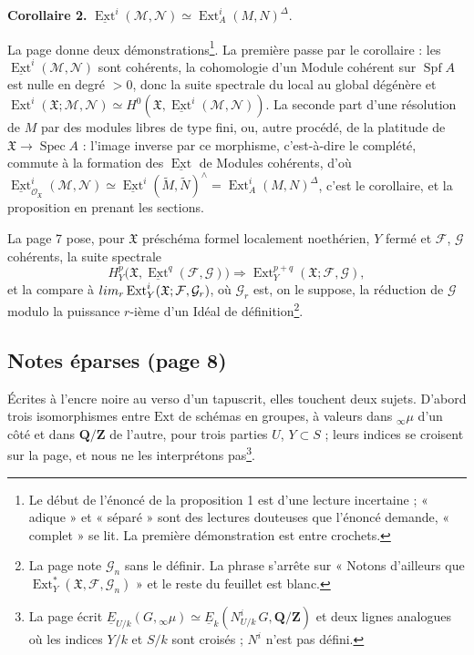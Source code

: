 \documentclass[11pt,a4paper]{article}
\begin{document}
\textbf{Corollaire 2.} $\underline{\operatorname{Ext}}^i(\mathcal{M},
\mathcal{N}) \simeq \operatorname{Ext}^i_A(M, N)^{\Delta}$.

La page donne deux démonstrations\footnote{Le début de l'énoncé de la
proposition 1 est d'une lecture incertaine ; « adique » et « séparé » sont des
lectures douteuses que l'énoncé demande, « complet » se lit. La première
démonstration est entre crochets.}. La première passe par le corollaire : les
$\underline{\operatorname{Ext}}^i(\mathcal{M}, \mathcal{N})$ sont cohérents, la
cohomologie d'un Module cohérent sur $\operatorname{Spf} A$ est nulle en degré
$> 0$, donc la suite spectrale du local au global dégénère et
$\operatorname{Ext}^i(\mathfrak{X}; \mathcal{M}, \mathcal{N}) \simeq
H^0(\mathfrak{X}, \underline{\operatorname{Ext}}^i(\mathcal{M}, \mathcal{N}))$.
La seconde part d'une résolution de $M$ par des modules libres de type fini,
ou, autre procédé, de la platitude de $\mathfrak{X} \to \operatorname{Spec} A$ :
l'image inverse par ce morphisme, c'est-à-dire le complété, commute à la
formation des $\underline{\operatorname{Ext}}$ de Modules cohérents, d'où
$\underline{\operatorname{Ext}}^i_{\mathcal{O}_{\mathfrak{X}}}(\mathcal{M},
\mathcal{N}) \simeq \underline{\operatorname{Ext}}^i(\widetilde{M},
\widetilde{N})^{\wedge} = \operatorname{Ext}^i_A(M, N)^{\Delta}$, c'est le
corollaire, et la proposition en prenant les sections.

La page 7 pose, pour $\mathfrak{X}$ préschéma formel localement noethérien,
$Y$ fermé et $\mathcal{F}$, $\mathcal{G}$ cohérents, la suite spectrale
\[
  H^p_Y\bigl(\mathfrak{X}, \underline{\operatorname{Ext}}^q(\mathcal{F},
  \mathcal{G})\bigr) \Rightarrow \operatorname{Ext}^{p+q}_Y(\mathfrak{X};
  \mathcal{F}, \mathcal{G}),
\]
et la compare à $\varprojlim_r \operatorname{Ext}^i_Y(\mathfrak{X};
\mathcal{F}, \mathcal{G}_r)$, où $\mathcal{G}_r$ est, on le suppose, la
réduction de $\mathcal{G}$ modulo la puissance $r$-ième d'un Idéal de
définition\footnote{La page note $\mathcal{G}_n$ sans le définir. La phrase
s'arrête sur « Notons d'ailleurs que $\operatorname{Ext}^{*}_Y(\mathfrak{X},
\mathcal{F}, \mathcal{G}_n)$ » et le reste du feuillet est blanc.}.

\subsection*{Notes éparses (page 8)}

Écrites à l'encre noire au verso d'un tapuscrit, elles touchent deux sujets.
D'abord trois isomorphismes entre $\mathrm{Ext}$ de schémas en groupes, à
valeurs dans ${}_{\infty}\mu$ d'un côté et dans $\mathbf{Q}/\mathbf{Z}$ de
l'autre, pour trois parties $U$, $Y \subset S$ ; leurs indices se croisent sur
la page, et nous ne les interprétons pas\footnote{La page écrit
$\underline{E}_{U/k}(G, {}_{\infty}\mu) \simeq \underline{E}_k(N^i_{U/k}\,G,
\mathbf{Q}/\mathbf{Z})$ et deux lignes analogues où les indices $Y/k$ et
$S/k$ sont croisés ; $N^i$ n'est pas défini.}.
\end{document}
